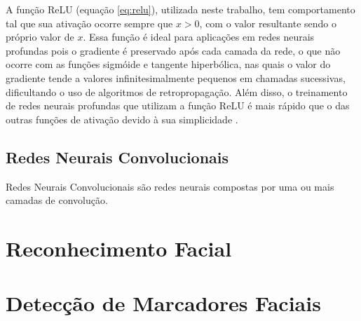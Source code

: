 A função ReLU (equação \ref{eq:relu}), utilizada neste trabalho, tem comportamento tal que sua ativação ocorre sempre que $x>0$, com o valor resultante sendo o próprio valor de $x$. 
Essa função é ideal para aplicações em redes neurais profundas pois o gradiente é preservado após cada camada da rede, o que não ocorre com as funções sigmóide e tangente hiperbólica, nas quais o valor do gradiente tende a valores infinitesimalmente pequenos em chamadas sucessivas, dificultando o uso de algoritmos de retropropagação.
Além disso, o treinamento de redes neurais profundas que utilizam a função ReLU é mais rápido que o das outras funções de ativação devido à sua simplicidade \cite{krizhevskyImageNetClassificationDeep2017}.

\subsection{Redes Neurais Convolucionais}
\label{sec:convnet}

Redes Neurais Convolucionais são redes neurais compostas por uma ou mais camadas de convolução.

\section{Reconhecimento Facial}
\label{sec:facialrecog}

\section{Detecção de Marcadores Faciais}
\label{sec:faciallm}